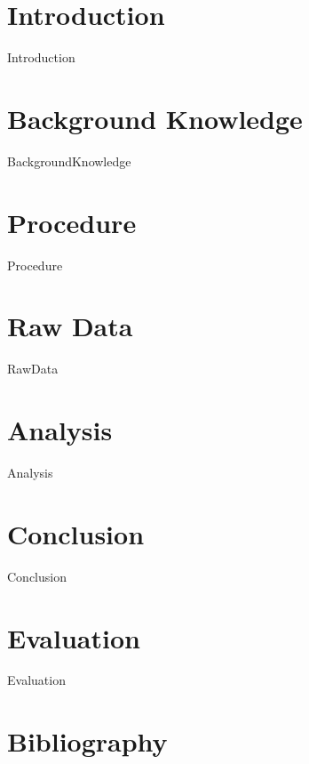 \documentclass[12pt,a4paper]{article}
\begin{document}
\tableofcontents
\section{Introduction}
	{Introduction}
\section{Background Knowledge}
	{BackgroundKnowledge}
\section{Procedure}
	{Procedure}
\section{Raw Data}
	{RawData}
\section{Analysis}
		{Analysis}
\section{Conclusion}
	{Conclusion}
\section{Evaluation}
	{Evaluation}
\section{Bibliography}
	
\end{document}
